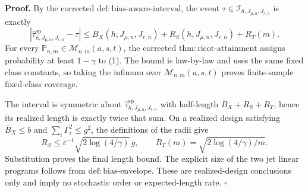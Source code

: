 \textbf{Proof.}
By the corrected \(\mathrm{def:bias\text{-}aware\text{-}interval}\), the event \(\tau\in\mathcal I_{h,J_{\mu,n},J_{r,n}}\) is exactly
\[
\left|\widehat\tau^{\mathrm{sp}}_{h,J_{\mu,n},J_{r,n}}-\tau\right|
\le\overline B_X(h,J_{\mu,n},J_{r,n})+R_S(h,J_{\mu,n},J_{r,n})+R_T(m).
\tag{1}
\]
For every \(\mathbb P_{n,m}\in\mathcal M_{n,m}(a,s,t)\), the corrected \(\mathrm{thm:ricot\text{-}attainment}\) assigns probability at least \(1-\gamma\) to (1). The bound is law-by-law and uses the same fixed class constants, so taking the infimum over \(\mathcal M_{n,m}(a,s,t)\) proves finite-sample fixed-class coverage.

The interval is symmetric about \(\widehat\tau^{\mathrm{sp}}_{h,J_{\mu,n},J_{r,n}}\) with half-length \(\overline B_X+R_S+R_T\), hence its realized length is exactly twice that sum. On a realized design satisfying \(\overline B_X\le b\) and \(\sum_i\Gamma_i^2\le g^2\), the definitions of the radii give
\[
R_S\le\varepsilon^{-1}\sqrt{2\log(4/\gamma)}\,g,
\qquad
R_T(m)=\sqrt{2\log(4/\gamma)/m}.
\tag{2}
\]
Substitution proves the final length bound. The explicit size of the two jet linear programs follows from \(\mathrm{def:bias\text{-}envelope}\). These are realized-design conclusions only and imply no stochastic order or expected-length rate. \(\square\)